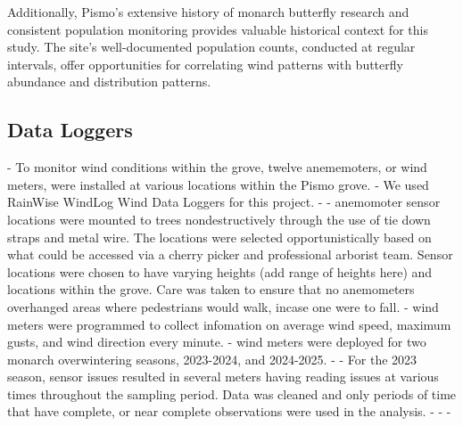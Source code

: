 Additionally, Pismo's extensive history of monarch butterfly research and consistent population monitoring provides valuable historical context for this study. The site's well-documented population counts, conducted at regular intervals, offer opportunities for correlating wind patterns with butterfly abundance and distribution patterns.

\subsection{Data Loggers}

- To monitor wind conditions within the grove, twelve anememoters, or wind meters, were installed at various locations within the Pismo grove.
- We used RainWise WindLog Wind Data Loggers for this project. 
- %
- anemomoter sensor locations were mounted to trees nondestructively through the use of tie down straps and metal wire. The locations were selected opportunistically based on what could be accessed via a cherry picker and professional arborist team. Sensor locations were chosen to have varying heights (add range of heights here) and locations within the grove. Care was taken to ensure that no anemometers overhanged areas where pedestrians would walk, incase one were to fall. 
- wind meters were programmed to collect infomation on average wind speed, maximum gusts, and wind direction every minute. 
- wind meters were deployed for two monarch overwintering seasons, 2023-2024, and 2024-2025. 
- %
- For the 2023 season, sensor issues resulted in several meters having reading issues at various times throughout the sampling period. Data was cleaned and only periods of time that have complete, or near complete observations were used in the analysis. 
- %
- %
- %

